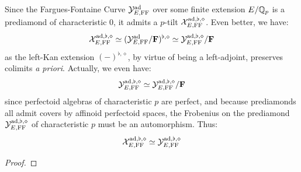                 \begin{remark} \label{remark: tilting_the_fargues_fontaine_curve}
                    Since the Fargues-Fontaine Curve $\mathcal{Y}^{\mathrm{ad}}_{E, \mathrm{FF}}$ over some finite extension $E/\mathbb{Q}_p$ is a prediamond of characteristic $0$, it admits a $p$-tilt $\mathcal{X}^{\mathrm{ad}, \flat, \diamond}_{E, \mathrm{FF}}$. Even better, we have:
                        $$\mathcal{X}^{\mathrm{ad}, \flat, \diamond}_{E, \mathrm{FF}} \simeq (\mathcal{Y}^{\mathrm{ad}}_{E, \mathrm{FF}}/\mathbf{F})^{\flat, \diamond} \simeq \mathcal{Y}^{\mathrm{ad}, \flat, \diamond}_{E, \mathrm{FF}}/\mathbf{F}$$
                    as the left-Kan extension $(-)^{\flat, \diamond}$, by virtue of being a left-adjoint, preserves colimits \textit{a priori}. Actually, we even have:
                        $$\mathcal{Y}^{\mathrm{ad}, \flat, \diamond}_{E, \mathrm{FF}} \simeq \mathcal{Y}^{\mathrm{ad}, \flat, \diamond}_{E, \mathrm{FF}}/\mathbf{F}$$
                    since perfectoid algebras of characteristic $p$ are perfect, and because prediamonds all admit covers by affinoid perfectoid spaces, the Frobenius on the prediamond $\mathcal{Y}^{\mathrm{ad}, \flat, \diamond}_{E, \mathrm{FF}}$ of characteristic $p$ must be an automorphism. Thus:
                        $$\mathcal{X}^{\mathrm{ad}, \flat, \diamond}_{E, \mathrm{FF}} \simeq \mathcal{Y}^{\mathrm{ad}, \flat, \diamond}_{E, \mathrm{FF}}$$
                \end{remark}
                
                \begin{proposition} \label{prop: fargues_fontaine_curve_as_moduli_space_of_untilts}
                    
                \end{proposition}
                    \begin{proof}
                        
                    \end{proof}
                    
                \begin{proposition} \label{prop: fargues_fontaine_curve_as_punctured_disc}
                    
                \end{proposition}
                

